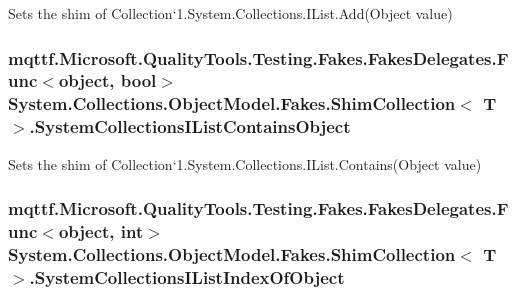 Sets the shim of Collection`1.System.\-Collections.\-I\-List.\-Add(\-Object value)

\hypertarget{class_system_1_1_collections_1_1_object_model_1_1_fakes_1_1_shim_collection_3_01_t_01_4_ab8ff36a2ca56e793042bba819a4d646c}{
\subsubsection[{System\-Collections\-I\-List\-Contains\-Object}]{\setlength{\rightskip}{0pt plus 5cm}mqttf.\-Microsoft.\-Quality\-Tools.\-Testing.\-Fakes.\-Fakes\-Delegates.\-Func$<$object, bool$>$ System.\-Collections.\-Object\-Model.\-Fakes.\-Shim\-Collection$<$ T $>$.System\-Collections\-I\-List\-Contains\-Object\hspace{0.3cm}{\ttfamily [set]}}}\label{class_system_1_1_collections_1_1_object_model_1_1_fakes_1_1_shim_collection_3_01_t_01_4_ab8ff36a2ca56e793042bba819a4d646c}


Sets the shim of Collection`1.System.\-Collections.\-I\-List.\-Contains(\-Object value)

\hypertarget{class_system_1_1_collections_1_1_object_model_1_1_fakes_1_1_shim_collection_3_01_t_01_4_a015dbdc4ae8ea7ba1f52e70b3c4b0bb4}{
\subsubsection[{System\-Collections\-I\-List\-Index\-Of\-Object}]{\setlength{\rightskip}{0pt plus 5cm}mqttf.\-Microsoft.\-Quality\-Tools.\-Testing.\-Fakes.\-Fakes\-Delegates.\-Func$<$object, int$>$ System.\-Collections.\-Object\-Model.\-Fakes.\-Shim\-Collection$<$ T $>$.System\-Collections\-I\-List\-Index\-Of\-Object\hspace{0.3cm}{\ttfamily [set]}}}\label{class_system_1_1_collections_1_1_object_model_1_1_fakes_1_1_shim_collection_3_01_t_01_4_a015dbdc4ae8ea7ba1f52e70b3c4b0bb4}


